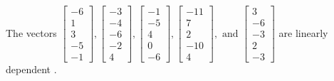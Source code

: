 \begin{exercise}
\begin{exerciseStatement}
  \end{exerciseStatement}
  \begin{exerciseAnswer}
   The vectors \(\left[\begin{array}{r}
-6 \\
1 \\
3 \\
-5 \\
-1
\end{array}\right] , \left[\begin{array}{r}
-3 \\
-4 \\
-6 \\
-2 \\
4
\end{array}\right] , \left[\begin{array}{r}
-1 \\
-5 \\
4 \\
0 \\
-6
\end{array}\right] , \left[\begin{array}{r}
-11 \\
7 \\
2 \\
-10 \\
4
\end{array}\right] , \text{ and } \left[\begin{array}{r}
3 \\
-6 \\
-3 \\
2 \\
-3
\end{array}\right]\) are 
  	 linearly dependent  .
  


  \end{exerciseAnswer}
\end{exercise}